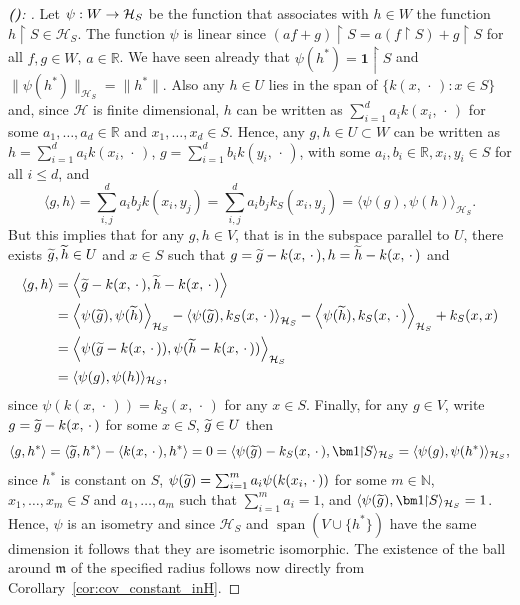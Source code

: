 \documentclass[AHL,Unicode,longabstracts,published]{cedram}
\theoremstyle{remark}
\DeclareMathOperator{\spn}{span}
\newcommand{\restrr}
{\!\!\upharpoonright\!\!}
\newcommand{\R}{\mathbb{R}}
\newcommand{\bbN}{\mathbb{N}}
\newcommand{\cH}{\mathcal{H}}
\newcommand{\mean}{\mathfrak{m}}
\let\oldtilde\tilde
\renewcommand*{\tilde}[1]{\mathchoice{\widetilde{#1}}{\widetilde{#1}}{\oldtilde{#1}}{\oldtilde{#1}}}
\renewcommand*{\to}{\mathchoice{\longrightarrow}{\rightarrow}{\rightarrow}{\rightarrow}}
\let\originalleft\left
\let\originalright\right
\renewcommand{\left}{\mathopen{}\mathclose\bgroup\originalleft}
\renewcommand{\right}{\aftergroup\egroup\originalright}
\newcounter{setofstep}
\newcounter{step}[setofstep]
\newenvironment{step}[1][]{\refstepcounter{step}\begin{proof}[{\textbf{(\thestep)}\if#1\empty\else: #1\fi}]}{\let\qed\relax\end{proof}}
\renewcommand{\thestep}{\alph{step}}
\begin{document}
\begin{proofc}
\begin{step}
Let $\psi:W \to \cH_S$ be the function that associates with $h\in W$ the function $h\restrr S \in \cH_S$. The function $\psi$ is linear since $(a f+g)\restrr S = a (f\restrr S) +g\restrr S$ for all $f,g \in W$, $a\in \R$. We have seen already that $\psi(h^*) = \bm 1\restrr S$ and $\|\psi(h^*)\|_{\cH_S} = \|h^*\|$. Also any $h \in U$ lies in the span of $\{ k(x,\,\cdot\,) : x\in S\}$ and, since $\cH$ is finite dimensional, $h$ can be written as $\sum_{i=1}^d a_i k(x_i,\,\cdot\,)$ for some $a_1,\dots, a_d \in \R$ and $x_1,\dots, x_d \in S$. Hence, any $g,h \in U \subset W$ can be written as $h = \sum_{i=1}^d a_i k(x_i,\,\cdot\,)$, $g = \sum_{i=1}^d b_i k(y_i,\,\cdot\,)$, with some $a_i,b_i \in \R, x_i, y_i \in S$ for all $i\leq d$, and
\[
\langle g,h \rangle = \sum_{i,j}^d a_i b_j k(x_i,y_j) = \sum_{i,j}^d a_i b_j k_S(x_i,y_j) = \langle \psi(g), \psi(h) \rangle_{\cH_S}.
\]
But this implies that for any $g,h \in V$, that is in the subspace parallel to $U$, there exists $\tilde g, \tilde h \in U$ and $x\in S$ such that $g = \tilde g - k(x,\,\cdot\,), h = \tilde h - k(x,\,\cdot\,)$ and
\begin{align*}
\langle g,h \rangle &= \left\langle \tilde g - k(x,\,\cdot\,), \tilde h - k(x,\,\cdot\,) \right\rangle \\
&= \left\langle \psi(\tilde g), \psi(\tilde h) \right\rangle_{\cH_S} - \left\langle \psi(\tilde g), k_S(x,\,\cdot\,) \right\rangle_{\cH_S} - \left\langle \psi(\tilde h), k_S(x,\,\cdot\,) \right\rangle_{\cH_S} + k_S(x,x) \\
&= \left\langle \psi(\tilde g - k(x,\,\cdot\,)), \psi(\tilde h - k(x,\,\cdot\,)) \right\rangle_{\cH_S}\\
&= \langle \psi(g), \psi(h) \rangle_{\cH_S},
\end{align*}
since $\psi(k(x,\,\cdot\,)) = k_S(x,\,\cdot\,)$ for any $x\in S$. Finally, for any $g \in V$, write $g = \tilde g - k(x,\,\cdot\,)$ for some $x\in S$, $\tilde g \in U$ then
\[
\langle g, h^* \rangle = \langle \tilde g, h^* \rangle - \langle k(x,\,\cdot\,), h^* \rangle = 0 = \langle \psi(\tilde g) - k_S(x,\,\cdot\,), \bm 1\restrr S\rangle_{\cH_S} = \langle \psi(g),\psi(h^*) \rangle_{\cH_S},
\]
since $h^*$ is constant on $S$, $\psi(\tilde g) = \sum_{i=1}^m a_i \psi(k(x_i,\,\cdot\,))$ for some $m\in \bbN$, $x_1,\dots, x_m \in S$ and $a_1,\dots, a_m$ such that $\sum_{i=1}^m a_i = 1$, and $\langle \psi(\tilde g), \bm 1\restrr S \rangle_{\cH_S} = 1$. Hence, $\psi$ is an isometry and since $\cH_S$ and $\spn(V \cup \{h^*\})$ have the same dimension it follows that they are isometric isomorphic. The existence of the ball around $\mean$ of the specified radius follows now directly from Corollary~\ref{cor:cov_constant_inH}.\qedhere
\end{step}\let\qed\relax
\end{proofc}
\end{document}
